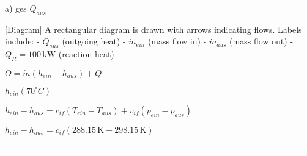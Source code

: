 a) ges \( Q_{aus} \)  

[Diagram]  
A rectangular diagram is drawn with arrows indicating flows. Labels include:  
- \( Q_{aus} \) (outgoing heat)  
- \( \dot{m}_{ein} \) (mass flow in)  
- \( \dot{m}_{aus} \) (mass flow out)  
- \( Q_R = 100 \, \text{kW} \) (reaction heat)  

\( O = \dot{m} (h_{ein} - h_{aus}) + Q \)  

\( h_{ein} (70^\circ C) \)  

\( h_{ein} - h_{aus} = c_{if} (T_{ein} - T_{aus}) + v_{if} (p_{ein} - p_{aus}) \)  

\( h_{ein} - h_{aus} = c_{if} (288.15 \, \text{K} - 298.15 \, \text{K}) \)  

---